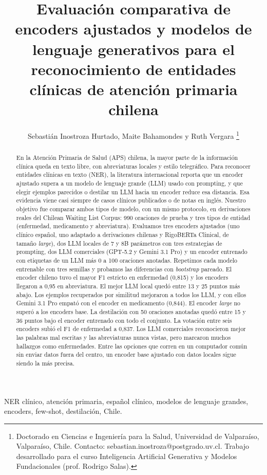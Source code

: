 \documentclass[10pt,journal,a4paper]{IEEEtran}
\title{Evaluación comparativa de encoders ajustados y modelos de lenguaje generativos para el reconocimiento de entidades clínicas de atención primaria chilena}
\author{
    Sebasti\'an Inostroza Hurtado, Maite Bahamondes y Ruth Vergara
    \thanks{Doctorado en Ciencias e Ingenier\'ia para la Salud, Universidad de Valpara\'iso, Valpara\'iso, Chile. Contacto: sebastian.inostroza@postgrado.uv.cl. Trabajo desarrollado para el curso Inteligencia Artificial Generativa y Modelos Fundacionales (prof. Rodrigo Salas).}
}
\begin{document}
\maketitle

\begin{abstract}
En la Atención Primaria de Salud (APS) chilena, la mayor parte de la información clínica queda en texto libre, con abreviaturas locales y estilo telegráfico. Para reconocer entidades clínicas en texto (NER), la literatura internacional reporta que un encoder ajustado supera a un modelo de lenguaje grande (LLM) usado con prompting, y que elegir ejemplos parecidos o destilar un LLM hacia un encoder reduce esa distancia. Esa evidencia viene casi siempre de casos clínicos publicados o de notas en inglés. Nuestro objetivo fue comparar ambos tipos de modelo, con un mismo protocolo, en derivaciones reales del Chilean Waiting List Corpus: 990 oraciones de prueba y tres tipos de entidad (enfermedad, medicamento y abreviatura). Evaluamos tres encoders ajustados (uno clínico español, uno adaptado a derivaciones chilenas y RigoBERTa Clinical, de tamaño \emph{large}), dos LLM locales de 7 y 8B parámetros con tres estrategias de prompting, dos LLM comerciales (GPT-5.2 y Gemini 3.1 Pro) y un encoder entrenado con etiquetas de un LLM más 0 a 100 oraciones anotadas. Repetimos cada modelo entrenable con tres semillas y probamos las diferencias con \emph{bootstrap} pareado. El encoder chileno tuvo el mayor F1 estricto en enfermedad (0,815) y los encoders llegaron a 0,95 en abreviatura. El mejor LLM local quedó entre 13 y 25 puntos más abajo. Los ejemplos recuperados por similitud mejoraron a todos los LLM, y con ellos Gemini 3.1 Pro empató con el encoder en medicamento (0,844). El encoder \emph{large} no superó a los encoders base. La destilación con 50 oraciones anotadas quedó entre 15 y 36 puntos bajo el encoder entrenado con todo el conjunto. La votación entre seis encoders subió el F1 de enfermedad a 0,837. Los LLM comerciales reconocieron mejor las palabras mal escritas y las abreviaturas nunca vistas, pero marcaron muchos hallazgos como enfermedades. Entre las opciones que corren en un computador común sin enviar datos fuera del centro, un encoder base ajustado con datos locales sigue siendo la más precisa.
\end{abstract}

\begin{IEEEkeywords}
NER clínico, atención primaria, español clínico, modelos de lenguaje grandes, encoders, few-shot, destilación, Chile.
\end{IEEEkeywords}
\end{document}
